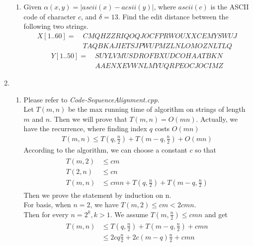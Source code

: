 \documentclass[12pt,a4paper]{article}
\makeatletter
\newtheorem*{solution}{Solution}
\theoremstyle{definition}
\renewenvironment{solution}[1][Solution] {\par\pushQED{\qed}\normalfont\topsep6\p@\@plus6\p@\relax\trivlist\item[\hskip\labelsep\bfseries#1\@addpunct{.}]\ignorespaces}{\popQED\endtrivlist\@endpefalse} \makeatother
\makeatother
\begin{document}
\begin{enumerate}
\begin{enumerate}
    	\item
    	Given $\alpha(x, y) = |ascii(x) - acsii(y)|$, where $ascii(c)$ is the ASCII code of character $c$, and $\delta=13$. Find the edit distance between the following two strings.
    	\begin{align*}
    		X[1..60]=&\ CMQHZZRIQOQJOCFPRWOUXXCEMYSWUJ\\
    		&\ TAQBKAJIETSJPWUPMZLNLOMOZNLTLQ	
    	\end{align*}
    	\begin{align*}
    		Y[1..50]=&\ SUYLVMUSDROFBXUDCOHAATBKN\\
    		&\ AAENXEVWNLMYUQRPEOCJOCIMZ
    	\end{align*}
    \end{enumerate}
    \begin{solution}
    ~
    \begin{enumerate}
        \item 
        Please refer to \emph{Code-SequenceAlignment.cpp}.\\
        Let $T(m,n)$ be the max running time of algorithm on strings of length $m$ and $n$. Then we will prove that $T(m,n) = O(mn)$. Actually, we have the recurrence, where finding index $q$ costs $O(mn)$
        \begin{align*}
            T(m,n) \leq T(q,\frac{n}{2})+T(m-q,\frac{n}{2}) +O(mn)
        \end{align*}
        According to the algorithm, we can choose a constant $c$ so that
        \begin{align*}
            \begin{split}
                T(m,2)&\leq cm\\
                T(2,n)&\leq cn\\
                T(m,n) &\leq cmn + T(q,\frac{n}{2})+T(m-q,\frac{n}{2})
            \end{split}
        \end{align*}
        Then we prove the statement by induction on n.\\
        For basis, when $n=2$, we have $T(m,2)\leq cm < 2cmn$.\\
        Then for every $n = 2^k,k>1$. We assume $T(m,\frac{n}{2})\leq cmn$ and get
        \begin{align*}
        \begin{split}
            T(m,n)&\leq T(q,\frac{n}{2})+T(m-q,\frac{n}{2})+cmn\\
            &\leq 2cq\frac{n}{2}+2c(m-q)\frac{n}{2}+cmn\\

\end{split}
\end{align*}
\end{enumerate}
\end{solution}
\end{enumerate}
\end{document}
